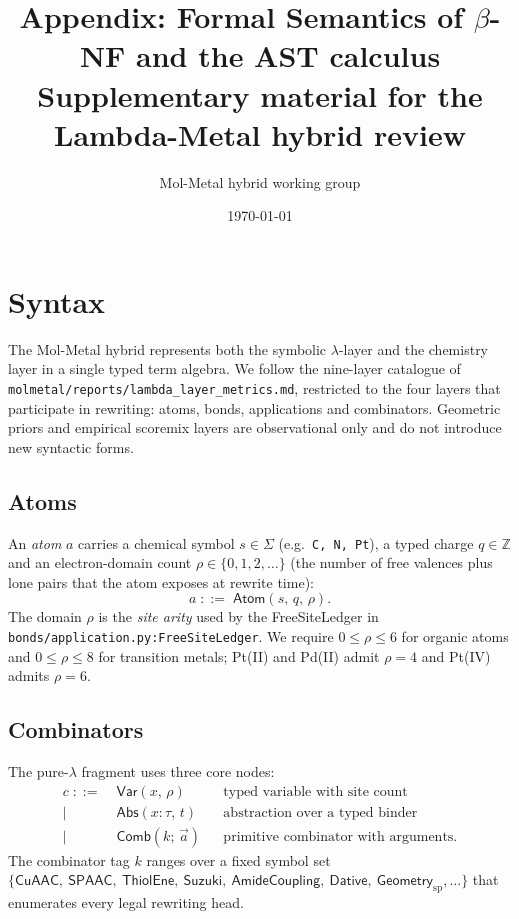 \documentclass{article}
\title{Appendix: Formal Semantics of $\beta$-NF and the AST calculus \\
\large Supplementary material for the Lambda-Metal hybrid review}
\author{Mol-Metal hybrid working group}
\date{\today}
\theoremstyle{definition}
\begin{document}
\maketitle
\appendix

\section{Syntax}
\label{sec:syntax}
The Mol-Metal hybrid represents both the symbolic $\lambda$-layer and the
chemistry layer in a single typed term algebra. We follow the nine-layer
catalogue of \texttt{molmetal/reports/lambda\_layer\_metrics.md}, restricted
to the four layers that participate in rewriting: atoms, bonds, applications
and combinators. Geometric priors and empirical scoremix layers are
observational only and do not introduce new syntactic forms.

\subsection{Atoms}
An \emph{atom} $a$ carries a chemical symbol $s \in \Sigma$ (e.g.\ \texttt{C, N, Pt}),
a typed charge $q \in \mathbb{Z}$ and an electron-domain count
$\rho \in \{0,1,2,\dots\}$ (the number of free valences plus lone pairs that
the atom exposes at rewrite time):
\[
  a \;::=\; \mathsf{Atom}(s,\,q,\,\rho).
\]
The domain $\rho$ is the \emph{site arity} used by the FreeSiteLedger in
\texttt{bonds/application.py:FreeSiteLedger}. We require $0 \le \rho \le 6$
for organic atoms and $0 \le \rho \le 8$ for transition metals; Pt(II) and
Pd(II) admit $\rho=4$ and Pt(IV) admits $\rho=6$.

\subsection{Combinators}
The pure-$\lambda$ fragment uses three core nodes:
\begin{align*}
  c \;::=\;& \mathsf{Var}(x,\,\rho)       && \text{typed variable with site count} \\
           \mid\;& \mathsf{Abs}(x{:}\tau,\,t) && \text{abstraction over a typed binder} \\
           \mid\;& \mathsf{Comb}(k;\,\vec a)  && \text{primitive combinator with arguments.}
\end{align*}
The combinator tag $k$ ranges over a fixed symbol set
$\{ \mathsf{CuAAC},\ \mathsf{SPAAC},\ \mathsf{ThiolEne},\ \mathsf{Suzuki},\
\mathsf{AmideCoupling},\ \mathsf{Dative},\ \mathsf{Geometry}_{\mathrm{sp}},\dots\}$
that enumerates every legal rewriting head.
\end{document}
